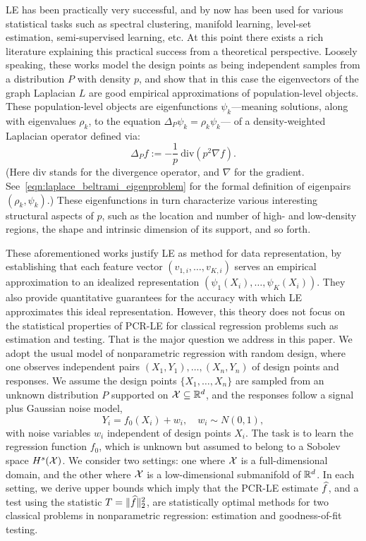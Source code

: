 LE has been practically very successful, and by now has been used for various statistical tasks such as spectral clustering, manifold learning, level-set estimation, semi-supervised learning, etc. At this point there exists a rich literature \citep{koltchinskii2000,belkin07,vonluxburg2008,burago2014,shi2015,singer2017,garciatrillos18,trillos2019, calder2019, cheng2021,dunson2021} explaining this practical success from a theoretical perspective. Loosely speaking, these works model the design points as being independent samples from a distribution $P$ with density $p$, and show that in this case the eigenvectors of the graph Laplacian $L$ are good empirical approximations of population-level objects. These population-level objects are eigenfunctions $\psi_k$---meaning solutions, along with eigenvalues $\rho_k$, to the equation $\Delta_P \psi_k = \rho_k \psi_k$--- of a density-weighted Laplacian operator defined via:
\begin{equation}
\label{eqn:density-weighted-laplace}
\Delta_Pf := -\frac{1}{p}~ \mathrm{div}(p^2 \nabla f).
\end{equation}  
(Here $\mathrm{div}$ stands for the divergence operator, and $\nabla$ for the gradient. See~\eqref{eqn:laplace_beltrami_eigenproblem} for the formal definition of eigenpairs $(\rho_k,\psi_k)$.) These eigenfunctions in turn characterize various interesting structural aspects of $p$, such as the location and number of high- and low-density regions, the shape and intrinsic dimension of its support, and so forth.

These aforementioned works justify LE as method for data representation, by establishing that each feature vector $(v_{1,i},\ldots,v_{K,i})$ serves an empirical approximation to an idealized representation $(\psi_1(X_i),\ldots,\psi_K(X_i))$. They also provide quantitative guarantees for the accuracy with which LE approximates this ideal representation. However, this theory does not focus on the statistical properties of PCR-LE for classical regression problems such as estimation and testing. That is the major question we address in this paper. We adopt the usual model of nonparametric regression with random design, where one observes independent pairs $(X_1,Y_1),\ldots,(X_n,Y_n)$ of design points and responses. We assume the design points $\{X_1,\ldots,X_n\}$ are sampled from an unknown distribution $P$ supported on $\mathcal{X} \subseteq \mathbb{R}^d$, and the responses follow a signal plus Gaussian noise model,
\begin{equation}
\label{eqn:model}
Y_i = f_0(X_i) + w_i, \quad w_i \sim N(0,1),
\end{equation}
with noise variables $w_i$  independent of design points $X_i$. The task is to learn the regression function $f_0$, which is unknown but assumed to belong to a Sobolev space $H^s(\mathcal{X})$. We consider two settings: one where $\mathcal{X}$ is a full-dimensional domain, and the other where $\mathcal{X}$ is a low-dimensional submanifold of $\mathbb{R}^d$. In each setting, we derive upper bounds which imply that the PCR-LE estimate $\widehat{f}$, and a test using the statistic $T = \|\widehat{f}\|_2^2$, are statistically optimal methods for two classical problems in nonparametric regression: estimation and goodness-of-fit testing.  

